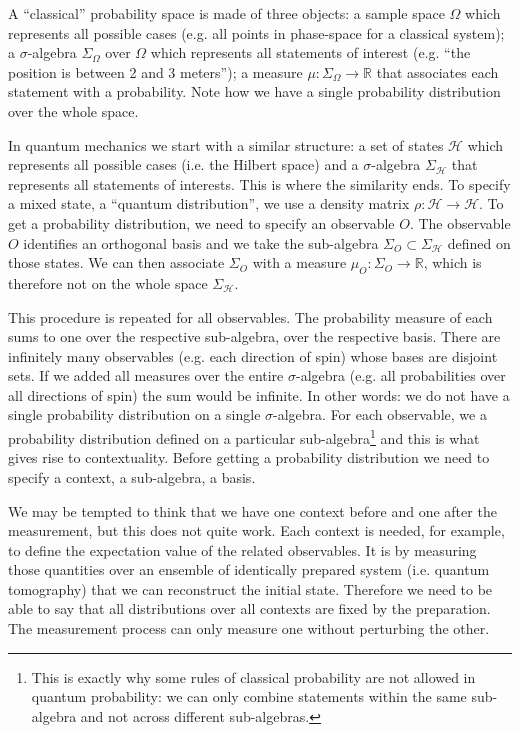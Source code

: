 \documentclass[10pt,twocolumn, nofootinbib]{revtex4-2}
\begin{document}
A ``classical'' probability space is made of three objects: a sample space $\Omega$ which represents all possible cases (e.g. all points in phase-space for a classical system); a $\sigma$-algebra $\Sigma_\Omega$ over $\Omega$ which represents all statements of interest (e.g. ``the position is between 2 and 3 meters''); a measure $\mu : \Sigma_\Omega \to \mathbb{R}$ that associates each statement with a probability. Note how we have a single probability distribution over the whole space.

In quantum mechanics we start with a similar structure: a set of states $\mathcal{H}$ which represents all possible cases (i.e. the Hilbert space) and a $\sigma$-algebra $\Sigma_{\mathcal{H}}$ that represents all statements of interests. This is where the similarity ends. To specify a mixed state, a ``quantum distribution'', we use a density matrix $\rho : \mathcal{H} \to \mathcal{H}$. To get a probability distribution, we need to specify an observable $O$. The observable $O$ identifies an orthogonal basis and we take the sub-algebra $\Sigma_O \subset \Sigma_{\mathcal{H}}$ defined on those states. We can then associate $\Sigma_O$ with a measure $\mu_O : \Sigma_O \to \mathbb{R}$, which is therefore not on the whole space $\Sigma_{\mathcal{H}}$.

This procedure is repeated for all observables. The probability measure of each sums to one over the respective sub-algebra, over the respective basis. There are infinitely many observables (e.g. each direction of spin) whose bases are disjoint sets. If we added all measures over the entire $\sigma$-algebra (e.g. all probabilities over all directions of spin) the sum would be infinite. In other words: we do not have a single probability distribution on a single $\sigma$-algebra. For each observable, we a probability distribution defined on a particular sub-algebra\footnote{This is exactly why some rules of classical probability are not allowed in quantum probability: we can only combine statements within the same sub-algebra and not across different sub-algebras.} and this is what gives rise to contextuality. Before getting a probability distribution we need to specify a context, a sub-algebra, a basis.

We may be tempted to think that we have one context before and one after the measurement, but this does not quite work. Each context is needed, for example, to define the expectation value of the related observables. It is by measuring those quantities over an ensemble of identically prepared system (i.e. quantum tomography) that we can reconstruct the initial state. Therefore we need to be able to say that all distributions over all contexts are fixed by the preparation. The measurement process can only measure one without perturbing the other.
\end{document}
